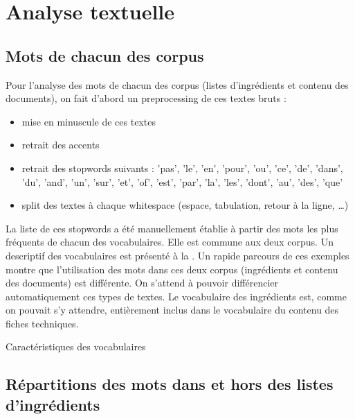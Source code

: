         
    \chapter{Analyse textuelle}

        \section{Mots de chacun des corpus}

        Pour l'analyse des mots de chacun des corpus (listes d'ingrédients et contenu des documents), on fait d'abord un preprocessing de ces textes bruts :
        \begin{itemize}
            \item mise en minuscule de ces textes
            \item retrait des accents
            \item retrait des stopwords suivants : {'pas', 'le', 'en', 'pour', 'ou', 'ce', 'de', 'dans', 'du', 'and', 'un', 'sur', 'et', 'of', 'est', 'par', 'la', 'les', 'dont', 'au', 'des', 'que'}
            \item split des textes à chaque whitespace (espace, tabulation, retour à la ligne, \dots)
        \end{itemize}
        La liste de ces stopwords a été manuellement établie à partir des mots les plus fréquents de chacun des vocabulaires.
        Elle est commune aux deux corpus.
        Un descriptif des vocabulaires est présenté à la .
        Un rapide parcours de ces exemples montre que l'utilisation des mots dans ces deux corpus (ingrédients et contenu des documents) est différente.
        On s'attend à pouvoir différencier automatiquement ces types de textes.
        Le vocabulaire des ingrédients est, comme on pouvait s'y attendre, entièrement inclus dans le vocabulaire du contenu des fiches techniques.
        
        {\renewcommand{\arraystretch}{1.5}%
        \begin{table}[htbp]
            \begin{center}
            {\scriptsize
            
            }
            \caption{Caractéristiques des vocabulaires}
            \label{tbl:vocabularies}
            \end{center}
        \end{table}
        }

        \section{Répartitions des mots dans et hors des listes d'ingrédients}

